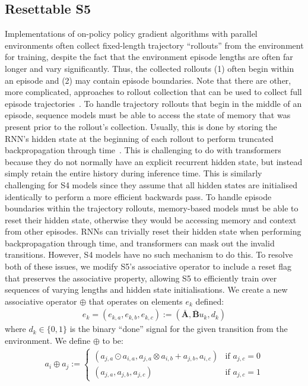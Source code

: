 \documentclass{article}
\newcommand{\newop}{\oplus}
\begin{document}
\subsection{Resettable S5}
Implementations of on-policy policy gradient algorithms with parallel environments often collect fixed-length trajectory ``rollouts'' from the environment for training, despite the fact that the environment episode lengths are often far longer and vary significantly. Thus, the collected rollouts (1) often begin within an episode and (2) may contain episode boundaries. Note that there are other, more complicated, approaches to rollout collection that can be used to collect full episode trajectories~\cite{liang2018rllib}.
To handle trajectory rollouts that begin in the middle of an episode, sequence models must be able to access the state of memory that was present prior to the rollout's collection. Usually, this is done by storing the RNN's hidden state at the beginning of each rollout to perform truncated backpropagation through time~\citep{williams1995gradient}. This is challenging to do with transformers because they do not normally have an explicit recurrent hidden state, but instead simply retain the entire history during inference time. This is similarly challenging for S4 models since they assume that all hidden states are initialised identically to perform a more efficient backwards pass.
To handle episode boundaries within the trajectory rollouts, memory-based models must be able to reset their hidden state, otherwise they would be accessing memory and context from other episodes. RNNs can trivially reset their hidden state when performing backpropagation through time, and transformers can mask out the invalid transitions. However, S4 models have no such mechanism to do this.
To resolve both of these issues, we modify S5's associative operator to include a reset flag that preserves the associative property, allowing S5 to efficiently train over sequences of varying lengths and hidden state initialisations. We create a new associative operator $\newop$ that operates on elements $e_k$ defined:
\begin{align}
e_k = (e_{k,a}, e_{k,b}, e_{k,c}) := (\mathbf{\bar{A}}, \mathbf{\bar{B}}u_k, d_k)
\end{align}
 where $d_k \in \{0, 1\}$ is the binary ``done'' signal for the given transition from the environment.
We define $\newop$ to be:
\begin{align}
a_i \newop a_j :=
\begin{cases}
(a_{j,a} \odot a_{i,a}, a_{j,a} \otimes a_{i, b} + a_{j, b}, a_{i, c}) & \text{if $a_{j,c}=0$}\\
(a_{j,a}, a_{j,b}, a_{j,c}) & \text{if $a_{j,c}=1$} \nonumber
\end{cases}
\end{align}
\end{document}

